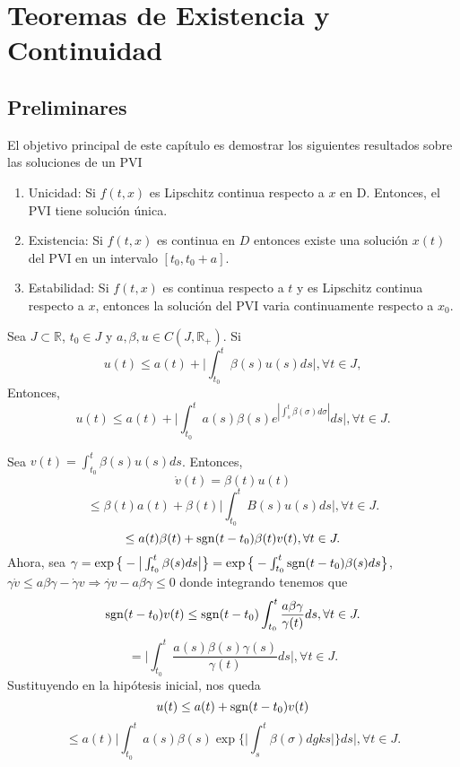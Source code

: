 \chapter{Teoremas de Existencia y Continuidad}

\section{Preliminares}

\begin{note}
  El objetivo principal de este capítulo es demostrar los siguientes resultados sobre las soluciones de un PVI
  \begin{enumerate}[label=(\roman*)]
    \item Unicidad: Si $f(t, x)$ es Lipschitz continua respecto a $x$ en D. Entonces, el PVI tiene solución única.
    \item Existencia: Si $f(t,x)$ es continua en $D$ entonces existe una solución $x(t)$ del PVI en un intervalo $[t_{0} , t_{0} + a]$.
    \item Estabilidad: Si $f(t,x)$ es continua respecto a $t$ y es Lipschitz continua respecto a $x$, entonces la solución del PVI varia continuamente respecto a $x_{0}$.
  \end{enumerate}
\end{note}

\begin{lem}
  Sea $J \subset \mathbb{R}$, $t_{0} \in J$ y $a,\beta,u \in C(J,\mathbb{R}_{+})$. Si 
  \[ 
    u(t) \leq a(t) + \Big | \int_{t_{0}}^{t} \beta(s) u(s) ds \Big |, \forall t \in J, 
  \] 
  Entonces,
  \[ 
     u(t) \leq a(t) + \Big | \int_{t_{0}}^{t} a(s) \beta(s) e^{| \int_{s}^{t} \beta(\sigma) d\sigma |} ds \Big |, \forall t \in J.
  \] 
\end{lem}

\begin{dem}
  Sea $v(t) = \int_{t_{0}}^{t} \beta(s) u(s) ds$. Entonces,
  \[ 
    \dot{v}(t) = \beta(t) u(t) 
  \] 
  \[ 
    \leq \beta(t) a(t) + \beta(t) \Big | \int_{t_{0}}^{t} B(s) u(s)  ds \Big |, \forall t \in J.
  \] 
  \[ 
    \leq a(t) \beta(t) + \operatorname{sgn}(t - t_{0}) \beta(t) v(t), \forall t \in J.
  \] 
  Ahora, sea $\gamma = \exp \big\{ - \big | \int_{t_{0}}^{t} \beta(s) ds \big | \big\} = \exp \big\{ - \int_{t_{0}}^{t} \operatorname{sgn} (t - t_{0}) \beta(s) ds \big\} $,
  $\gamma \dot{v} \leq a \beta \gamma - \dot{\gamma} v \Rightarrow \dot{\gamma v} - a \beta \gamma \leq 0$ donde integrando tenemos que
  \[ 
    \operatorname{sgn}(t-t_{0}) v(t) \leq \operatorname{sgn}(t -t_{0}) \int_{t_{0}}^{t} \frac{a \beta \gamma }{\gamma(t)} ds , \forall t \in J.
  \] 
  \[ 
    = \Big | \int_{t_{0}}^{t} \frac{a(s) \beta(s) \gamma(s)}{\gamma(t)} ds \Big |, \forall t \in J. 
  \] 
  Sustituyendo en la hipótesis inicial, nos queda
  \[ 
     u(t) \leq a(t) + \operatorname{sgn}(t -t_{0})v(t)
  \] 
  \[ 
    \leq a(t) \Big | \int_{t_{0}}^{t} a(s) \beta(s) \exp \Big\{ \Big | \int_{s}^{t} \beta(\sigma) dgks \Big | \Big\} ds \Big |, \forall t \in J.
  \] 
\end{dem}

